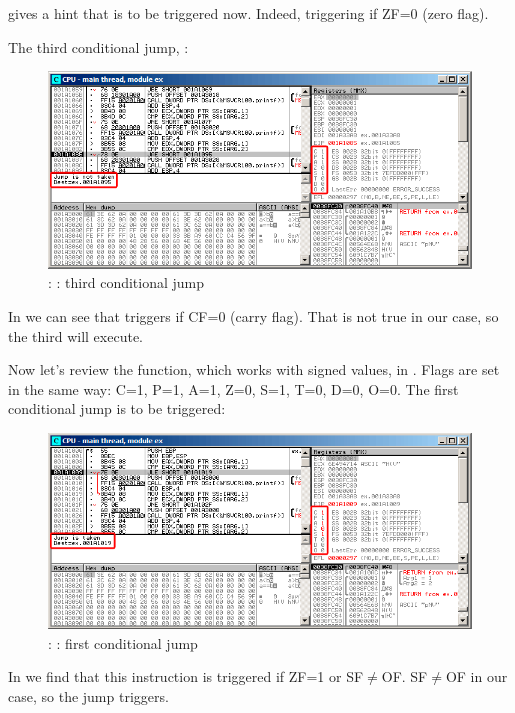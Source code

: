 \olly gives a hint that \JNZ is to be triggered now.
Indeed, \JNZ triggering if ZF=0 (zero flag).

\clearpage
The third conditional jump, \JNB:

\begin{figure}[H]
\centering
\includegraphics[scale=\FigScale]{patterns/07_jcc/simple/olly_unsigned3.png}
\caption{\olly: : third conditional jump}
\label{fig:jcc_olly_unsigned_3}
\end{figure}

In \cite{Intel} we can see that \JNB triggers if CF=0 (carry flag).
That is not true in our case, so the third \printf will execute.

\clearpage
Now let's review the  function, which works with signed values, in \olly.
Flags are set in the same way: C=1, P=1, A=1, Z=0, S=1, T=0, D=0, O=0.
The first conditional jump \JLE is to be triggered:

\begin{figure}[H]
\centering
\includegraphics[scale=\FigScale]{patterns/07_jcc/simple/olly_signed1.png}
\caption{\olly: : first conditional jump}
\label{fig:jcc_olly_signed_1}
\end{figure}

In \cite{Intel} we find that this instruction is triggered if ZF=1 or SF$\neq$OF.
SF$\neq$OF in our case, so the jump triggers.

